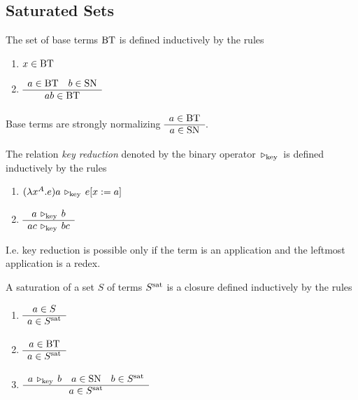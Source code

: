 \subsection{Saturated Sets}

\begin{definition} %
  The set of base terms $\text{BT}$ is defined inductively by the rules
  \begin{enumerate}

  \item $x \in \text{BT}$

  \item $\begin{array}{c} a \in \text{BT} \quad b \in \text{SN} \\ \hline a b \in \text{BT}\end{array}$
  \end{enumerate}
\end{definition}


\begin{lemma}
  \label{BTSN}
  Base terms are strongly normalizing $\begin{array}{c} a \in \text{BT} \\ \hline a \in \text{SN}\end{array}$.
\end{lemma}








\begin{definition} %
  The relation \emph{key reduction} denoted by the binary operator
  $\,\triangleright_{\text{key}}\,$ is defined inductively by the rules
  \begin{enumerate}

  \item $(\lambda x^A.e) a \,\triangleright_{\text{key}}\, e[x:=a]$

  \item $\begin{array}{c} a \,\triangleright_{\text{key}}\, b \\ \hline a c \,\triangleright_{\text{key}}\, b c\end{array}$
  \end{enumerate}
\end{definition}

I.e. key reduction is possible only if the term is an application and the
leftmost application is a redex.






\begin{definition} %
  A saturation of a set $S$ of terms $S^{\text{sat}}$ is a closure defined inductively
  by the rules
  \begin{enumerate}

  \item $\begin{array}{c} a \in S \\ \hline a \in S^{\text{sat}}\end{array}$

  \item $\begin{array}{c} a \in \text{BT} \\ \hline a \in S^{\text{sat}}\end{array}$

  \item $\begin{array}{c} a \,\triangleright_{\text{key}}\, b \quad a \in \text{SN} \quad b \in S^{\text{sat}} \\ \hline a \in S^{\text{sat}}\end{array}$
  \end{enumerate}
\end{definition}

